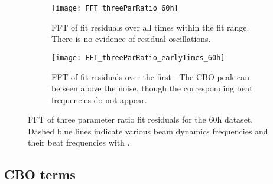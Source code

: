 \begin{figure}
\centering
    \begin{subfigure}[t]{0.67\textwidth}
        \centering
        \texttt{[image: FFT\_threeParRatio\_60h]}
        \caption{FFT of fit residuals over all times within the fit range. There is no evidence of residual oscillations.}
    \end{subfigure}%

    \begin{subfigure}[t]{0.67\textwidth}
        \centering
        \texttt{[image: FFT\_threeParRatio\_earlyTimes\_60h]}
        \caption{FFT of fit residuals over the first . The CBO peak can be seen above the noise, though the corresponding beat frequencies do not appear.}
    \end{subfigure}
\caption[FFT of three parameter ratio fit residuals]{FFT of three parameter ratio fit residuals for the 60h dataset. Dashed blue lines indicate various beam dynamics frequencies and their beat frequencies with \wa.}
\label{fig:fft_threeParamRatio}
\end{figure}




\subsection{CBO terms}
\label{sub:cboterms}


